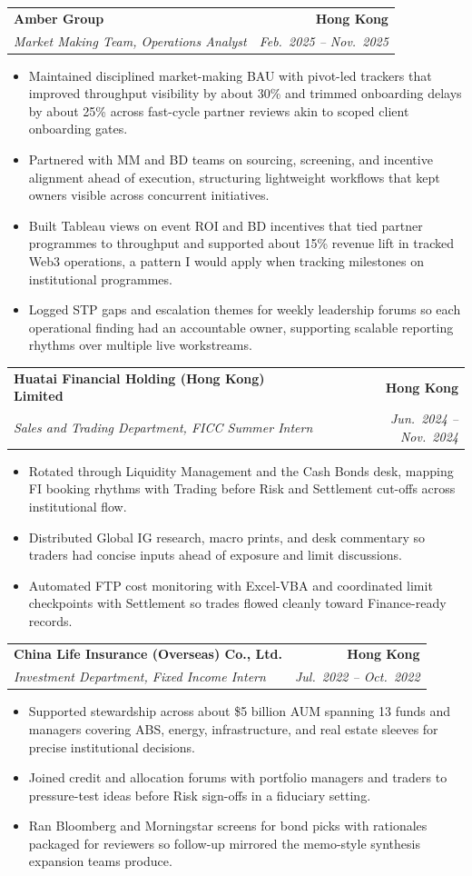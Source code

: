 \documentclass[9pt,a4paper]{extarticle}
\makeatletter
\newcommand{\resumeSubheading}[4]{%
  \vspace{0.6em}%
  \begin{tabular*}{\textwidth}{l@{\extracolsep{\fill}}r}
    \textbf{#1} & \textbf{#2} \\
    \textit{\small #3} & \textit{\small #4} \\
  \end{tabular*}\vspace{0.32em}}
\makeatother
\begin{document}
\resumeSubheading{Amber Group}{Hong Kong}{Market Making Team, Operations Analyst}{Feb.\ 2025 -- Nov.\ 2025}
\begin{itemize}
  \item Maintained disciplined market-making BAU with pivot-led trackers that improved throughput visibility by about 30\% and trimmed onboarding delays by about 25\% across fast-cycle partner reviews akin to scoped client onboarding gates.
  \item Partnered with MM and BD teams on sourcing, screening, and incentive alignment ahead of execution, structuring lightweight workflows that kept owners visible across concurrent initiatives.
  \item Built Tableau views on event ROI and BD incentives that tied partner programmes to throughput and supported about 15\% revenue lift in tracked Web3 operations, a pattern I would apply when tracking milestones on institutional programmes.
  \item Logged STP gaps and escalation themes for weekly leadership forums so each operational finding had an accountable owner, supporting scalable reporting rhythms over multiple live workstreams.
\end{itemize}

\resumeSubheading{Huatai Financial Holding (Hong Kong) Limited}{Hong Kong}{Sales and Trading Department, FICC Summer Intern}{Jun.\ 2024 -- Nov.\ 2024}
\begin{itemize}
  \item Rotated through Liquidity Management and the Cash Bonds desk, mapping FI booking rhythms with Trading before Risk and Settlement cut-offs across institutional flow.
  \item Distributed Global IG research, macro prints, and desk commentary so traders had concise inputs ahead of exposure and limit discussions.
  \item Automated FTP cost monitoring with Excel-VBA and coordinated limit checkpoints with Settlement so trades flowed cleanly toward Finance-ready records.
\end{itemize}

\resumeSubheading{China Life Insurance (Overseas) Co., Ltd.}{Hong Kong}{Investment Department, Fixed Income Intern}{Jul.\ 2022 -- Oct.\ 2022}
\begin{itemize}
  \item Supported stewardship across about \$5 billion AUM spanning 13 funds and managers covering ABS, energy, infrastructure, and real estate sleeves for precise institutional decisions.
  \item Joined credit and allocation forums with portfolio managers and traders to pressure-test ideas before Risk sign-offs in a fiduciary setting.
  \item Ran Bloomberg and Morningstar screens for bond picks with rationales packaged for reviewers so follow-up mirrored the memo-style synthesis expansion teams produce.
\end{itemize}
\end{document}
